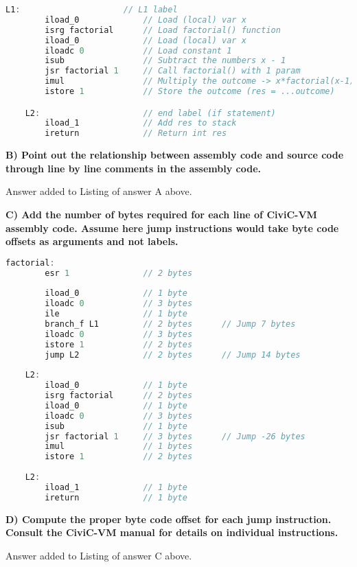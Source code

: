 \documentclass[hidelinks]{uva-inf-article}
\begin{document}
\begin{flushleft}
\begin{lstlisting}[basicstyle=\small, language=C, label=lst:code, caption=Assembly code, captionpos=b]
    L1:                     // L1 label
        iload_0             // Load (local) var x
        isrg factorial      // Load factorial() function 
        iload_0             // Load (local) var x
        iloadc 0            // Load constant 1
        isub                // Subtract the numbers x - 1
        jsr factorial 1     // Call factorial() with 1 param
        imul                // Multiply the outcome -> x*factorial(x-1)
        istore 1            // Store the outcome (res = ...outcome)

    L2:                     // end label (if statement)
        iload_1             // Add res to stack
        ireturn             // Return int res 
\end{lstlisting}



\textbf{B) Point out the relationship between assembly code and source code through line by line
comments in the assembly code.}
\par Answer added to Listing of answer A above.

\textbf{C) Add the number of bytes required for each line of CiviC-VM assembly code. Assume here
jump instructions would take byte code offsets as arguments and not labels.}
\begin{lstlisting}[basicstyle=\small, language=C, label=lst:code, caption=Assembly code with number of bytes, captionpos=b]
    factorial:    
        esr 1               // 2 bytes
    
        iload_0             // 1 byte
        iloadc 0            // 3 bytes
        ile                 // 1 byte
        branch_f L1         // 2 bytes      // Jump 7 bytes
        iloadc 0            // 3 bytes
        istore 1            // 2 bytes
        jump L2             // 2 bytes      // Jump 14 bytes
    
    L2:                   
        iload_0             // 1 byte
        isrg factorial      // 2 bytes
        iload_0             // 1 byte
        iloadc 0            // 3 bytes
        isub                // 1 byte
        jsr factorial 1     // 3 bytes      // Jump -26 bytes
        imul                // 1 bytes
        istore 1            // 2 bytes
    
    L2:                    
        iload_1             // 1 byte
        ireturn             // 1 byte
    \end{lstlisting}
    

\textbf{D) Compute the proper byte code offset for each jump instruction. Consult the CiviC-VM
manual for details on individual instructions.}
\par Answer added to Listing of answer C above.


\end{flushleft}
\end{document}
